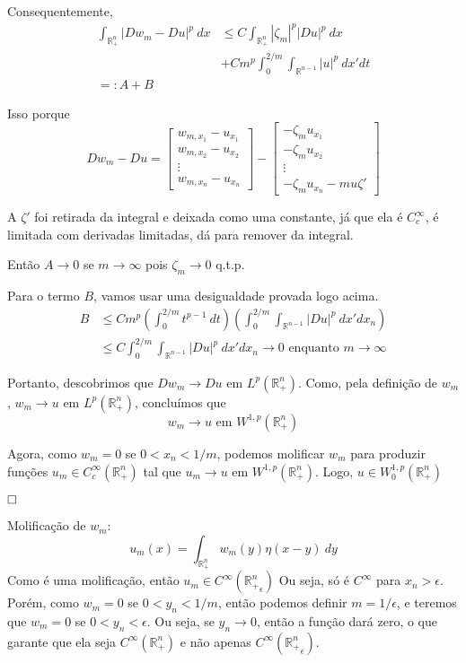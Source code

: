 \documentclass[a4paper, 11pt]{book}
\newcommand{\qed}{$\hfill\square$}
\newcommand{\R}{\mathbb{R}}
\newcommand{\e}{\epsilon}
\begin{document}
Consequentemente, \begin{align*}
	 \int_{\R^n_+} |Dw_m - Du|^p\ dx &\leq C \int_{\R^n_+} |\zeta_m|^p |Du|^p \ dx  \\
	  & +C m^p \int_0^{2/m} \int_{\R^{n-1}} |u|^p \ dx'dt \\
	 =: A + B
\end{align*}

Isso porque \[ Dw_m - Du = \begin{bmatrix}
	w_{m, x_1} - u_{x_1} \\
		w_{m, x_2} - u_{x_2} \\
	\vdots \\
	w_{m, x_n} - u_{x_n}
\end{bmatrix}  - \begin{bmatrix}
- \zeta_m u_{x_1} \\
-\zeta_m u_{x_2} \\
\vdots \\
-\zeta_m u_{x_n} - mu\zeta'
\end{bmatrix}\] 

A $ \zeta' $ foi retirada da integral e deixada como uma constante, já que ela é $C^\infty_c$, é limitada com derivadas limitadas, dá para remover da integral.


Então $A\rightarrow 0$ se $m\rightarrow \infty$ pois $\zeta_m \rightarrow 0$ q.t.p.

Para o termo $B$, vamos usar uma desigualdade provada logo acima. \begin{align*}
	B &\leq C m^p \left(\int_0^{2/m} t^{p-1}\ dt\right)\left(\int_0^{2/m} \int_{\R^{n-1}} |Du|^p \ dx' dx_n\right) \\
	&\leq C \int_0^{2/m} \int_{\R^{n-1}} |Du|^p \ dx'dx_n \rightarrow 0 \text{ enquanto } m \rightarrow \infty
\end{align*}

Portanto, descobrimos que $ Dw_m \rightarrow Du \text{ em } L^{p}(\R^n_+)$. Como, pela definição de $w_m$, $w_m\rightarrow u$ em $ L^p(\R^n_+)$, concluímos que \[ w_m \rightarrow u \text{ em } W^{1,p}(\R^n_+) \]

Agora, como $ w_m=0 $ se $ 0 < x_n < 1/m $, podemos molificar $ w_m $ para produzir funções $ u_m \in C^\infty_c(\R^n_+) $ tal que $ u_m \rightarrow u \text{ em } W^{1,p}(\R^n_+)$. Logo, $ u \in W^{1,p}_0 (\R^n_+) $

\qed

Molificação de $w_m$: \[ u_m(x) = \int_{\R^n_+} w_m(y) \eta(x-y)\ dy \] Como é uma molificação, então $u_m \in C^\infty({\R^n_+}_\e)$ Ou seja, só é $C^\infty$ para $x_n> \e$. Porém, como $w_m=0$ se $0 < y_n < 1/m$, então podemos definir $m=1/\e$, e teremos que $w_m=0$ se $0 < y_n < \e$. Ou seja, se $y_n \rightarrow 0$, então a função dará zero, o que garante que ela seja $C^\infty({\R^n_+})$ e não apenas $C^\infty({\R^n_+}_\e)$.
\end{document}
